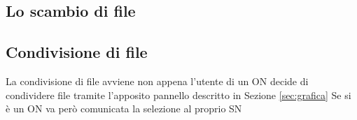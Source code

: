 \subsection{Lo scambio di file}\label{sec:scambio}

\subsection{Condivisione di file}%
La condivisione di file avviene non appena l'utente di un ON decide di condividere file tramite l'apposito pannello descritto in Sezione \ref{sec:grafica}
Se si è un ON va però comunicata la selezione al proprio SN